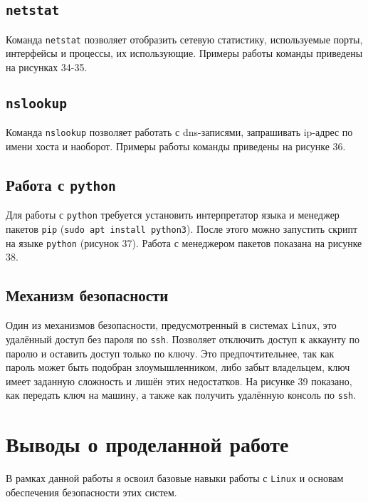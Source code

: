 \FloatBarrier


\subsection{\texttt{netstat}}

Команда \texttt{netstat} позволяет отобразить сетевую статистику, используемые порты, интерфейсы и процессы, их использующие. Примеры работы команды приведены на рисунках 34-35.

\FloatBarrier


\subsection{\texttt{nslookup}}

Команда \texttt{nslookup} позволяет работать с dns-записями, запрашивать ip-адрес по имени хоста и наоборот. Примеры работы команды приведены на рисунке 36.

\FloatBarrier


\subsection{Работа с \texttt{python}}

Для работы с \texttt{python} требуется установить интерпретатор языка и менеджер пакетов \texttt{pip} (\texttt{sudo apt install python3}). После этого можно запустить скрипт на языке \texttt{python} (рисунок 37). Работа с менеджером пакетов показана на рисунке 38.

\FloatBarrier


\subsection{Механизм безопасности}

Один из механизмов безопасности, предусмотренный в системах \texttt{Linux}, это удалённый доступ без пароля по \texttt{ssh}. Позволяет отключить доступ к аккаунту по паролю и оставить доступ только по ключу. Это предпочтительнее, так как пароль может быть подобран злоумышленником, либо забыт владельцем, ключ имеет заданную сложность и лишён этих недостатков. На рисунке 39 показано, как передать ключ на машину, а также как получить удалённую консоль по \texttt{ssh}.

\FloatBarrier


\clearpage

\section{Выводы о проделанной работе}
В рамках данной работы я освоил базовые навыки работы с \texttt{Linux} и основам обеспечения безопасности этих систем.

\clearpage